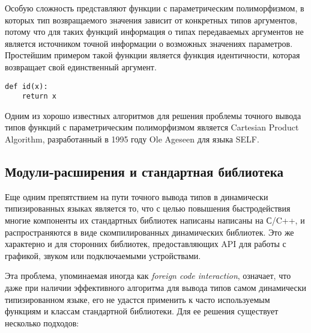 Особую сложность представляют функции с параметрическим полиморфизмом, в
которых тип возвращаемого значения зависит от конкретных типов аргументов, 
потому что для таких функций информация о типах передаваемых аргументов не
является источником точной информации о возможных значениях параметров.
Простейшим примером такой функции является функция идентичности,
которая возвращает свой единственный аргумент.

\begin{lstlisting}
def id(x):
    return x
\end{lstlisting}

Одним из хорошо известных алгоритмов для решения проблемы точного вывода типов
функций с параметрическим полиморфизмом является Cartesian Product Algorithm, 
разработанный в 1995 году Ole Ageseen для языка SELF. 




\subsection{Модули-расширения и стандартная библиотека}
\label{sec:extensions-and-stdlib}

Еще одним препятствием на пути точного вывода типов в динамически типизированных
языках является то, что с целью повышения быстродействия многие компоненты их
стандартных библиотек написаны написаны на С/C++, и распространяются в
виде скомпилированных динамических библиотек. Это же характерно и для сторонних
библиотек, предоставляющих API для работы с графикой, звуком или подключаемыми
устройствами.

Эта проблема, упоминаемая иногда как \emph{foreign code interaction}, означает, что даже при
наличии эффективного алгоритма для вывода типов самом динамически типизированном
языке, его не удастся применить к часто используемым функциям и классам
стандартной библиотеки. Для ее решения существует несколько подходов:

